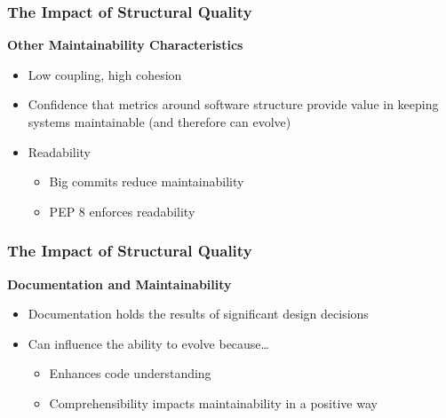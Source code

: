 \documentclass{beamer}
\begin{document}
\begin{frame}
  \frametitle{The Impact of Structural Quality}
  \textbf{Other Maintainability Characteristics}
  \begin{itemize}
    \vspace{0.35cm}
    \item Low coupling, high cohesion
    
    \vspace{0.35cm}
    \item Confidence that metrics around software structure provide value in keeping systems maintainable (and therefore can evolve) %
    
    \vspace{0.35cm}
    \item Readability
    \begin{itemize}
      \item Big commits reduce maintainability
      \item PEP 8 enforces readability
    \end{itemize}
  \end{itemize}
\end{frame}

\begin{frame}
  \frametitle{The Impact of Structural Quality}
  \textbf{Documentation and Maintainability}
  \begin{itemize}
    \vspace{0.35cm}
    \item Documentation holds the results of significant design decisions
    
    \vspace{0.35cm}
    \item Can influence the ability to evolve because\dots
    \begin{itemize}
      \item Enhances code understanding
      \item Comprehensibility impacts maintainability in a positive way  
    \end{itemize}
  \end{itemize}
\end{frame}
\end{document}
